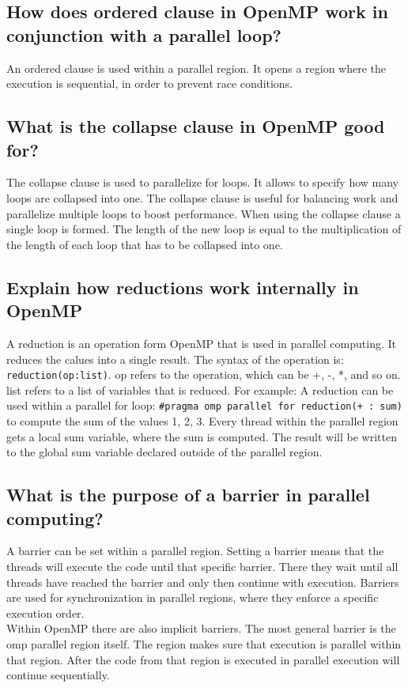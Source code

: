 \documentclass[runningheads]{llncs}
\begin{document}
\subsection{How does ordered clause in OpenMP work in conjunction with a parallel loop?}
An ordered clause is used within a parallel region. It opens a region where the execution is sequential, 
in order to prevent race conditions.


\subsection{What is the collapse clause in OpenMP good for?}
The collapse clause is used to parallelize for loops. It allows to specify how many loops are collapsed into one. 
The collapse clause is useful for balancing work and parallelize multiple loops to boost performance.
When using the collapse clause a single loop is formed. The length of the new loop is equal to the multiplication 
of the length of each loop that has to be collapsed into one.

\subsection{Explain how reductions work internally in OpenMP}
A reduction is an operation form OpenMP that is used in parallel computing. 
It reduces the calues into a single result.
The syntax of the operation is: \lstinline{reduction(op:list)}. op refers to the operation, which can be +, -, *, and so on. 
list refers to a list of variables that is reduced.
For example: A reduction can be used within a parallel for loop: 
\lstinline{#pragma omp parallel for reduction(+ : sum) } to compute the sum of the values 1, 2, 3. 
Every thread within the parallel region gets a local sum variable, where the sum is computed. 
The result will be written to the global sum variable declared outside of the parallel region.

\subsection{What is the purpose of a barrier in parallel computing?}
A barrier can be set within a parallel region. Setting a barrier means that the threads will execute the code until that specific barrier. 
There they wait until all threads have reached the barrier and only then continue with execution.
Barriers are used for synchronization in parallel regions, where they enforce a specific execution order. \\
Within OpenMP there are also implicit barriers. The most general barrier is the omp parallel region itself. 
The region makes sure that execution is parallel within that region. 
After the code from that region is executed in parallel execution will continue sequentially. 
\end{document}
